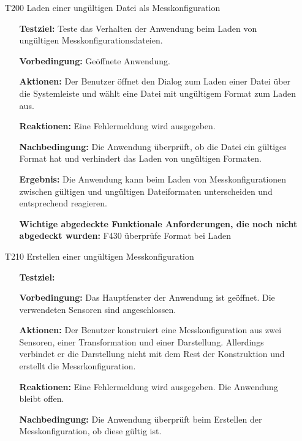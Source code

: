 \documentclass[parskip=full]{scrartcl}
\begin{document}
\begin{itemize} 

\item[T200] Laden einer ungültigen Datei als Messkonfiguration
\begin{itemize}

\item []\textbf{Testziel:} Teste das Verhalten der Anwendung beim Laden von ungültigen Messkonfigurationsdateien.

\item []\textbf{Vorbedingung:} Geöffnete Anwendung.
\item []\textbf{Aktionen:} Der Benutzer öffnet den Dialog zum Laden einer Datei über die Systemleiste und wählt eine Datei mit ungültigem Format zum Laden aus.
\item []\textbf{Reaktionen:} Eine Fehlermeldung wird ausgegeben.
\item []\textbf{Nachbedingung:} Die Anwendung überprüft, ob die Datei ein gültiges Format hat und verhindert das Laden von ungültigen Formaten. 


\item []\textbf{Ergebnis:} Die Anwendung kann beim Laden von Messkonfigurationen zwischen gültigen und ungültigen Dateiformaten unterscheiden und entsprechend reagieren.
\item []\textbf{Wichtige abgedeckte Funktionale Anforderungen, die noch nicht abgedeckt wurden:} F430 überprüfe Format bei Laden

\end{itemize}

\item[T210] Erstellen einer ungültigen Messkonfiguration
\begin{itemize}

\item []\textbf{Testziel:} 

\item []\textbf{Vorbedingung:} Das Hauptfenster der Anwendung ist geöffnet. Die verwendeten Sensoren sind angeschlossen.

\item []\textbf{Aktionen:} Der Benutzer konstruiert eine Messkonfiguration aus zwei Sensoren, einer Transformation und einer Darstellung. Allerdings verbindet er die Darstellung nicht mit dem Rest der Konstruktion und erstellt die Messrkonfiguration.
\item []\textbf{Reaktionen:} Eine Fehlermeldung wird ausgegeben. Die Anwendung bleibt offen.
\item []\textbf{Nachbedingung:} Die Anwendung überprüft beim Erstellen der Messkonfiguration, ob diese gültig ist.


\end{itemize}
\end{itemize}
\end{document}
